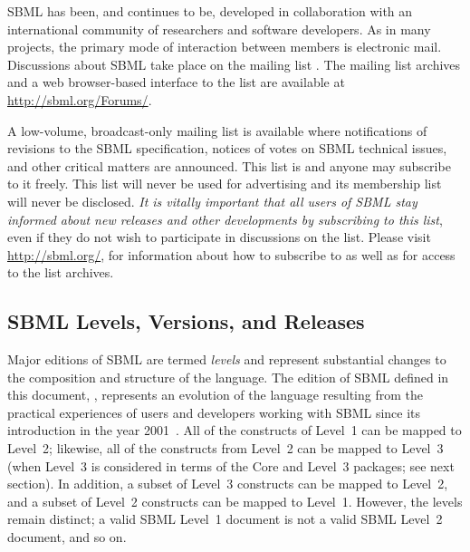 SBML has been, and continues to be, developed in collaboration
with an international community of researchers and software
developers.  As in many projects, the primary mode of interaction
between members is electronic mail.  Discussions about SBML take
place on the mailing list
.  The
mailing list archives and a web browser-based interface to the
list are available at \url{http://sbml.org/Forums/}.

A low-volume, broadcast-only mailing list is available 
where notifications of
revisions to the SBML speci\-fication, notices of votes on SBML
technical issues, and other critical matters are announced.  This
list is 
and anyone may subscribe to it freely.  This list will never be
used for advertising and its membership list will never be
disclosed.  \emph{It is vitally important that all users of SBML
  stay informed about new releases and other developments by
  subscribing to this list}, even if they do not wish to
participate in discussions on the
 list.
Please visit \url{http://sbml.org/},
for information about how to subscribe to
 as well
as for access to the list archives.


\subsection{SBML Levels, Versions, and Releases}
\label{sec:levels-versions-releases}

Major editions of SBML are termed \emph{levels} and represent
substantial changes to the composition and structure of the
language.  The edition of SBML defined in this document,
\sbmlthree, represents an evolution of the language resulting from
the practical experiences of users and developers working with
SBML since its introduction in the year
2001~\citep{hucka:2001,hucka:2003}.  All of the constructs of
Level~1 can be mapped to Level~2; likewise, all of the constructs
from Level~2 can be mapped to Level~3 (when Level~3 is considered
in terms of the Core and Level~3 packages; see next section).  In
addition, a subset of Level~3 constructs can be mapped to Level~2,
and a subset of Level~2 constructs can be mapped to Level~1.
However, the levels remain distinct; a valid SBML Level~1 document
is not a valid SBML Level~2 document, and so on.

